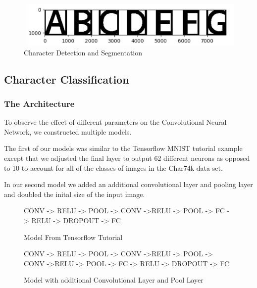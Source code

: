 \documentclass[11pt]{article}
\begin{document}
    \begin{figure}
        \centering
        \includegraphics[scale=0.4]{character_segmentation_example.png}
        \caption{Character Detection and Segmentation}
        \label{fig:character_segmentation}
    \end{figure}

\subsection{Character Classification}

\subsubsection{The Architecture}
    To observe the effect of different parameters on the Convolutional Neural Network, we constructed multiple models.

    The first of our models was similar to the Tensorflow MNIST tutorial example except that we adjusted the final layer to output 62 different neurons as opposed to 10 to account for all of the classes of images in the Char74k data set.
    
    In our second model we added an additional convolutional layer and pooling layer and doubled the inital size of the input image.

    \begin{figure}
        \centering
        \begin{framed}
        CONV -\>> RELU -> POOL -> CONV ->RELU -> POOL -> FC -> RELU -> DROPOUT -> FC
        \end{framed}
        \caption{Model From Tensorflow Tutorial}
        \label{fig:model_1}
    \end{figure}
    
    \begin{figure}
        \centering
        \begin{framed}
        CONV -\>> RELU -> POOL -> CONV ->RELU -> POOL -> CONV ->RELU -> POOL -> FC -> RELU -> DROPOUT -> FC
        \end{framed}
        \caption{Model with additional Convolutional Layer and Pool Layer}
        \label{fig:model_2}
    \end{figure}
\end{document}
